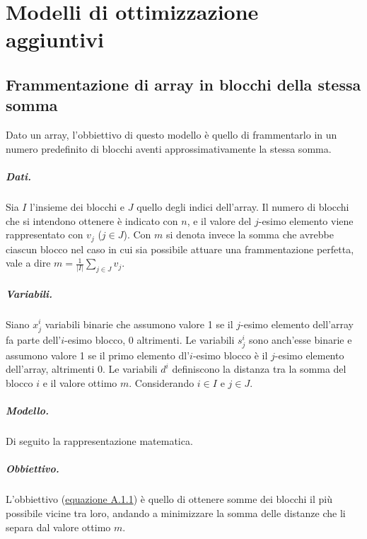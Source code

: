 \chapter{Modelli di ottimizzazione aggiuntivi}
\label{cap:modelli-di-ottimizzazione-framm}

\section{Frammentazione di array in blocchi della stessa somma}
\label{sec:framm-equals}

Dato un array, l'obbiettivo di questo modello è quello di frammentarlo in un numero predefinito di blocchi aventi approssimativamente la stessa somma.


\paragraph{Dati.} Sia $I$ l'insieme dei blocchi e $J$ quello degli indici dell'array. Il numero di blocchi che si intendono ottenere è indicato con $n$, e il valore del $j$-esimo elemento viene rappresentato con $v_j$ ($j \in J$). Con $m$ si denota invece la somma che avrebbe ciascun blocco nel caso in cui sia possibile attuare una frammentazione perfetta, vale a dire $m = \frac{1}{|I|}\sum_{j \in J}v_j$.

\paragraph{Variabili.} Siano $x^i_j$ variabili binarie che assumono valore 1 se il $j$-esimo elemento dell'array fa parte dell'$i$-esimo blocco, 0 altrimenti. Le variabili $s^i_j$ sono anch'esse binarie e assumono valore 1 se il primo elemento dl'$i$-esimo blocco è il $j$-esimo elemento dell'array, altrimenti 0. Le variabili $d^i$ definiscono la distanza tra la somma del blocco $i$ e il valore ottimo $m$. Considerando $i \in I$ e $j \in J$.

\paragraph{Modello.} Di seguito la rappresentazione matematica.



\paragraph{Obbiettivo.} L'obbiettivo (\hyperref[eq:somma-obj]{equazione A.1.1}) è quello di ottenere somme dei blocchi il più possibile vicine tra loro, andando a minimizzare la somma delle distanze che li separa dal valore ottimo $m$.

